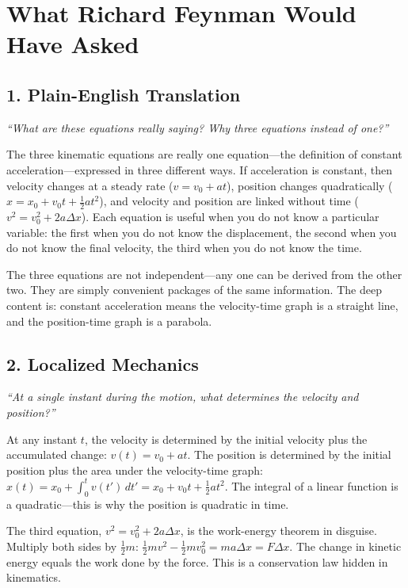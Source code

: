 \documentclass[11pt,openright]{book}
\begin{document}
\section*{What Richard Feynman Would Have Asked}

\subsection*{1. Plain-English Translation}
\textit{``What are these equations really saying? Why three equations instead of one?''}

The three kinematic equations are really one equation---the definition of constant acceleration---expressed in three different ways. If acceleration is constant, then velocity changes at a steady rate ($v = v_0 + at$), position changes quadratically ($x = x_0 + v_0 t + \frac{1}{2}at^2$), and velocity and position are linked without time ($v^2 = v_0^2 + 2a\Delta x$). Each equation is useful when you do not know a particular variable: the first when you do not know the displacement, the second when you do not know the final velocity, the third when you do not know the time.

The three equations are not independent---any one can be derived from the other two. They are simply convenient packages of the same information. The deep content is: constant acceleration means the velocity-time graph is a straight line, and the position-time graph is a parabola.

\subsection*{2. Localized Mechanics}
\textit{``At a single instant during the motion, what determines the velocity and position?''}

At any instant $t$, the velocity is determined by the initial velocity plus the accumulated change: $v(t) = v_0 + at$. The position is determined by the initial position plus the area under the velocity-time graph: $x(t) = x_0 + \int_0^t v(t')\,dt' = x_0 + v_0 t + \frac{1}{2}at^2$. The integral of a linear function is a quadratic---this is why the position is quadratic in time.

The third equation, $v^2 = v_0^2 + 2a\Delta x$, is the work-energy theorem in disguise. Multiply both sides by $\frac{1}{2}m$: $\frac{1}{2}mv^2 - \frac{1}{2}mv_0^2 = ma\Delta x = F\Delta x$. The change in kinetic energy equals the work done by the force. This is a conservation law hidden in kinematics.
\end{document}
